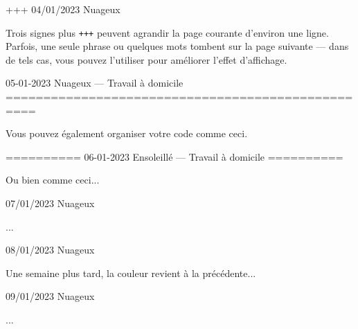 \documentclass[11pt, paperstyle=light yellow, color entry, day-month-year]{jwjournal}
\begin{document}
+++
04/01/2023  Nuageux

  Trois signes plus \texttt{+++} peuvent agrandir la page courante d'environ une ligne. Parfois, une seule phrase ou quelques mots tombent sur la page suivante --- dans de tels cas, vous pouvez l'utiliser pour améliorer l'effet d'affichage.



05-01-2023    Nuageux       --- Travail à domicile
==================================================

Vous pouvez également organiser votre code comme ceci.


==========
06-01-2023    Ensoleillé    --- Travail à domicile
==========

Ou bien comme ceci...



07/01/2023  Nuageux

  ...



08/01/2023  Nuageux

  Une semaine plus tard, la couleur revient à la précédente...



09/01/2023  Nuageux

  ...
\end{document}
